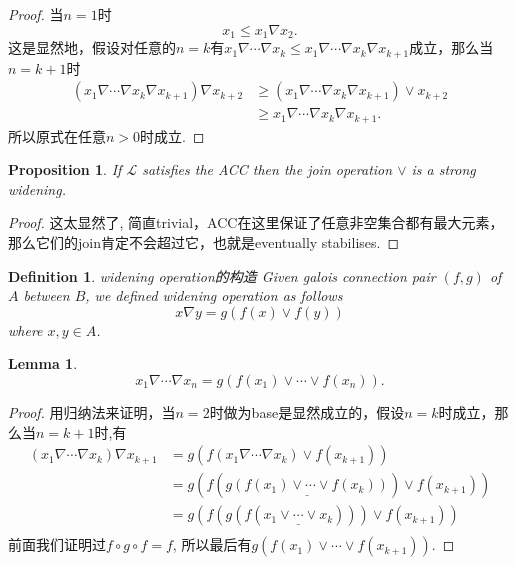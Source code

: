 \documentclass{article}
\newtheorem{lemma}[theorem]{Lemma}
\newtheorem{proposition}[theorem]{Proposition}
\newtheorem{definition}[theorem]{Definition}
\begin{document}
\begin{proof}
当$n=1$时
$$
x_1 \leq x_1 \nabla x_2.
$$
这是显然地，假设对任意的$n = k$有$x_1 \nabla \cdots \nabla x_k \leq x_1 \nabla \cdots \nabla x_k \nabla x_{k+1}$成立，那么当$n = k+1$时
$$
\begin{aligned}
(x_1 \nabla \cdots \nabla x_k \nabla x_{k+1}) \nabla x_{k+2} &\geq (x_1 \nabla \cdots \nabla x_k \nabla x_{k+1}) \vee x_{k+2} \\
& \geq x_1 \nabla \cdots \nabla x_k \nabla x_{k+1}.
\end{aligned}
$$
所以原式在任意$n >0$时成立.
\end{proof}

\begin{proposition}
\rm If $\mathcal{L}$ satisfies the ACC then the join operation $\vee$ is a strong widening.
\end{proposition}

\begin{proof}
这太显然了, 简直trivial，ACC在这里保证了任意非空集合都有最大元素，那么它们的join肯定不会超过它，也就是eventually stabilises.
\end{proof}

\begin{definition}
\rm {\color{red} widening operation的构造} Given galois connection pair $(f,g)$ of $A$ between $B$, we defined widening operation as follows
$$
x \nabla y = g(f(x) \vee f(y)) 
$$
where $x,y \in A$.
\end{definition}

\begin{lemma}\label{widening-by-galois-connection}
$$
x_1 \nabla \cdots \nabla x_n = g(f(x_1) \vee \cdots \vee f(x_n)).
$$
\end{lemma}

\begin{proof}
用归纳法来证明，当$n=2$时做为base是显然成立的，假设$n=k$时成立，那么当$n=k+1$时,有
$$
\begin{aligned}
(x_1 \nabla \cdots \nabla x_k) \nabla x_{k+1} &= g(f(x_1 \nabla \cdots \nabla x_k) \vee f(x_{k+1})) \\
&= g(f(\underline{g(f(x_1) \vee \cdots \vee f(x_k))}) \vee f(x_{k+1})) \\
&= g(f(g(f(\underline{x_1 \vee \cdots \vee x_k}))) \vee f(x_{k+1})) \\
\end{aligned} 
$$
前面我们证明过$f\circ g \circ f = f$, 所以最后有$ g(f(x_1) \vee \cdots \vee f(x_{k+1}))$.
\end{proof}
\end{document}
